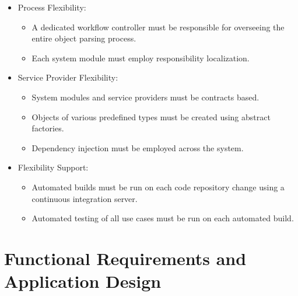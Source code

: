 \documentclass[a4paper,12pt]{article}
\begin{document}
\begin{itemize}
				\begin{itemize}
					\item Process Flexibility:
						\begin{itemize}
							\item A dedicated workflow controller must be responsible for overseeing the entire object parsing process.
							\item Each system module must employ responsibility localization.
						\end{itemize}
					\item Service Provider Flexibility:
						\begin{itemize}
							\item System modules and service providers must be contracts based.
							\item Objects of various predefined types must be created using abstract factories.
							\item Dependency injection must be employed across the system.
						\end{itemize}
					\item Flexibility Support:
						\begin{itemize}
							\item Automated builds must be run on each code repository change using a continuous integration server.
							\item Automated testing of all use cases must be run on each automated build.
						\end{itemize}
				\end{itemize}
		\end{itemize}

\section{Functional Requirements and Application Design}
	
\end{document}
